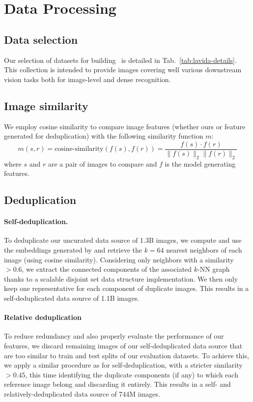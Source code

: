 \section{Data Processing}
\label{sec:supp-data}

\subsection{Data selection}
\label{subsec:supp-data-sources}
Our selection of datasets for building \LaViDa\ is detailed in Tab.~\ref{tab:lavida-details}. 
This collection is intended to provide images covering well various downstream vision tasks both for image-level and dense recognition.

\subsection{Image similarity}
\label{subsec:supp-data-similarity}
We employ cosine similarity to compare image features (whether ours or feature generated for deduplication) with the following similarity function $m$:
$$m(s, r) = \text{cosine-similarity}\left(f\left(s\right),f\left(r\right)\right) = \frac{f(s)\cdot{}f(r)}{\lVert f(s)\rVert_2\lVert f(r)\rVert_2}$$
where $s$ and $r$ are a pair of images to compare and $f$ is the model generating features.

\subsection{Deduplication}
\label{subsec:supp-data-dedup}

\paragraph{Self-deduplication.} 
To deduplicate our uncurated data source of 1.3B images, we compute and use the embeddings generated by \cite{pizzi2022self} and retrieve the $k = 64$ nearest neighbors of each image (using cosine similarity). 
Considering only neighbors with a similarity ${>}0.6$, we extract the connected components of the associated $k$-NN graph thanks to a scalable disjoint set data structure implementation. 
We then only keep one representative for each component of duplicate images. 
This results in a self-deduplicated data source of 1.1B images.

\paragraph{Relative deduplication}
To reduce redundancy and also properly evaluate the performance of our features, we discard remaining images of our self-deduplicated data source that are too similar to train and test splits of our evaluation datasets. 
To achieve this, we apply a similar procedure as for self-deduplication, with a stricter similarity ${>}0.45$, this time identifying the duplicate components (if any) to which each reference image belong and discarding it entirely. 
This results in a self- and relatively-deduplicated data source of 744M images.

